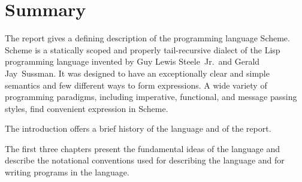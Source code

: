 
\thispagestyle{empty}




\chapter*{Summary}

The report gives a defining description of the programming language
Scheme.  Scheme is a statically scoped and properly tail-recursive
dialect of the Lisp programming language invented by Guy Lewis
Steele~Jr.\ and Gerald Jay~Sussman.  It was designed to have an
exceptionally clear and simple semantics and few different ways to
form expressions.  A wide variety of programming paradigms, including
imperative, functional, and message passing styles, find convenient
expression in Scheme.

\vest The introduction offers a brief history of the language and of
the report.

\vest The first three chapters present the fundamental ideas of the
language and describe the notational conventions used for describing the
language and for writing programs in the language.

